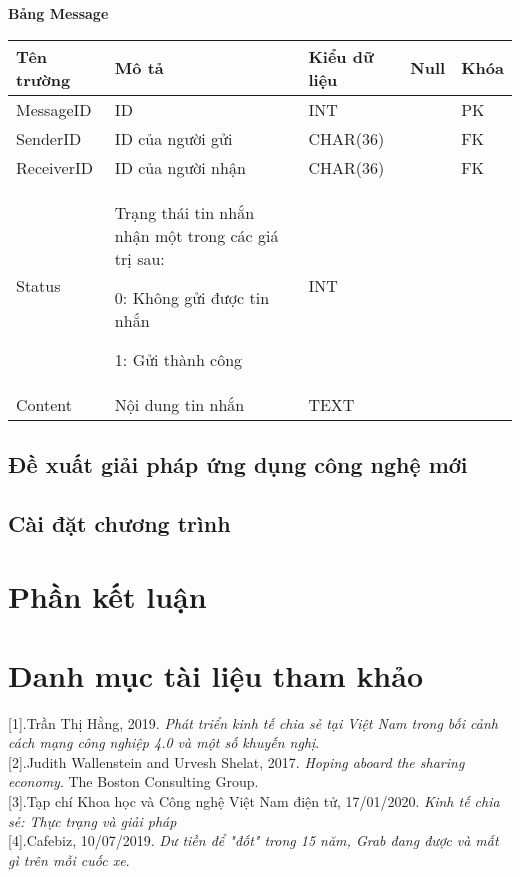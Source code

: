 \documentclass[12pt,a4paper]{report}
\begin{document}
\textbf{ Bảng Message}

\begin{center}
 \begin{tabular}{|>{\raggedright\arraybackslash}m{3.5cm}|>{\raggedright\arraybackslash}m{5cm}|>{\raggedright\arraybackslash}m{3.6cm}| >{\centering\arraybackslash}m{1cm}| >{\centering\arraybackslash}m{1cm}|}
\hline 
\textbf{Tên trường} & \textbf{Mô tả} & \textbf{Kiểu dữ liệu} & \textbf{Null} & \textbf{Khóa} \\ 
\hline 
MessageID & ID & INT &  & PK \\ 
\hline 
SenderID & ID của người gửi & CHAR(36) & & FK \\ 
\hline 
ReceiverID & ID của người nhận & CHAR(36) &  & FK \\ 
\hline 
Status & Trạng thái tin nhắn nhận một trong các giá trị sau:

0: Không gửi được tin nhắn

1: Gửi thành công & INT &  &  \\ 
\hline 
Content & Nội dung tin nhắn & TEXT &  &  \\ 
\hline 
\end{tabular}
 \end{center} 
 
\section{Đề xuất giải pháp ứng dụng công nghệ mới}
\section{Cài đặt chương trình}
\chapter*{Phần kết luận}
\chapter*{Danh mục tài liệu tham khảo}
[1].Trần Thị Hằng, 2019. \textit{Phát triển kinh tế chia sẻ tại Việt Nam trong bối cảnh cách mạng công nghiệp 4.0 và một số khuyến nghị}.\\

[2].Judith Wallenstein and Urvesh Shelat, 2017. \textit{Hoping aboard the sharing
economy}. The Boston Consulting Group.\\

[3].Tạp chí Khoa học và Công nghệ Việt Nam điện tử, 17/01/2020. \textit{Kinh tế chia sẻ: Thực trạng và giải pháp}\\

[4].Cafebiz, 10/07/2019. \textit{Dư tiền để "đốt" trong 15 năm, Grab đang được và mất gì trên mỗi cuốc xe}.
\end{document}
